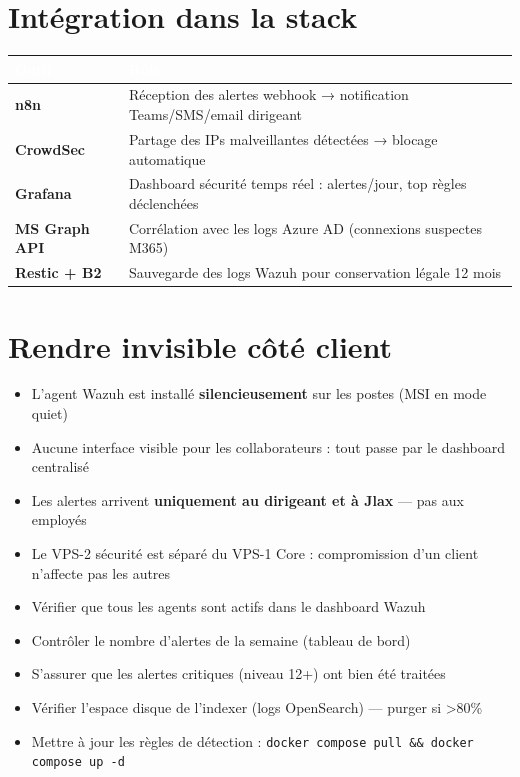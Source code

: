\documentclass[11pt, a4paper]{article}
\begin{document}
\section{Intégration dans la stack}

\begin{center}
\renewcommand{\arraystretch}{1.4}
\begin{tabularx}{\linewidth}{>{\bfseries}p{2.8cm} X}
\toprule
\rowcolor{tabheader}
\textcolor{white}{\textbf{Outil}} & \textcolor{white}{\textbf{Rôle}} \\
\midrule
n8n & Réception des alertes webhook → notification Teams/SMS/email dirigeant \\
\rowcolor{rowgray}
CrowdSec & Partage des IPs malveillantes détectées → blocage automatique \\
Grafana & Dashboard sécurité temps réel : alertes/jour, top règles déclenchées \\
\rowcolor{rowgray}
MS Graph API & Corrélation avec les logs Azure AD (connexions suspectes M365) \\
Restic + B2 & Sauvegarde des logs Wazuh pour conservation légale 12 mois \\
\bottomrule
\end{tabularx}
\end{center}

\section{Rendre invisible côté client}

\begin{itemize}
  \item L'agent Wazuh est installé \textbf{silencieusement} sur les postes (MSI en mode quiet)
  \item Aucune interface visible pour les collaborateurs : tout passe par le dashboard centralisé
  \item Les alertes arrivent \textbf{uniquement au dirigeant et à Jlax} — pas aux employés
  \item Le VPS-2 sécurité est séparé du VPS-1 Core : compromission d'un client n'affecte pas les autres
\end{itemize}

\begin{checklist}
  \begin{itemize}
    \item[$\square$] Vérifier que tous les agents sont actifs dans le dashboard Wazuh
    \item[$\square$] Contrôler le nombre d'alertes de la semaine (tableau de bord)
    \item[$\square$] S'assurer que les alertes critiques (niveau 12+) ont bien été traitées
    \item[$\square$] Vérifier l'espace disque de l'indexer (logs OpenSearch) — purger si >80\%
    \item[$\square$] Mettre à jour les règles de détection : \texttt{docker compose pull \&\& docker compose up -d}
  \end{itemize}
\end{checklist}
\end{document}
